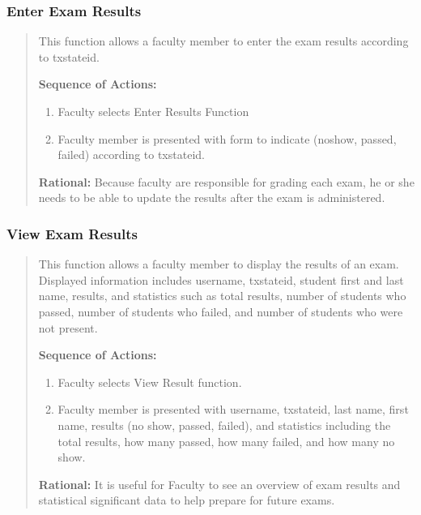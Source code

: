    \subsubsection{Enter Exam Results} 
   \begin{quote} %
         This function allows a faculty member to enter the exam results
         according to txstateid.
         
         \textbf{Sequence of Actions:}
         \begin{enumerate}
            \item Faculty selects Enter Results Function
            \item Faculty member is presented with form to indicate (noshow,
               passed, failed) according to txstateid. 
         \end{enumerate}

         \textbf{Rational:}
         Because faculty are responsible for grading each exam, he or she needs
         to be able to update the results after the exam is administered.
   \end{quote} %

   \subsubsection{View Exam Results} 
   \begin{quote} %
         This function allows a faculty member to display the results of an
         exam. Displayed information includes username, txstateid, student
         first and last name, results, and statistics such as total results,
         number of students who passed, number of students who
         failed, and number of students who were not present.
         
         \textbf{Sequence of Actions:}
         \begin{enumerate}
            \item Faculty selects View Result function.
            \item Faculty member is presented with username, txstateid, last
               name, first name, results (no show, passed, failed), and
               statistics including the total results, how many passed, how many
               failed, and how many no show. 
         \end{enumerate}

         \textbf{Rational:}
         It is useful for Faculty to see an overview of exam results and
         statistical significant data to help prepare for future exams.
   \end{quote} %

